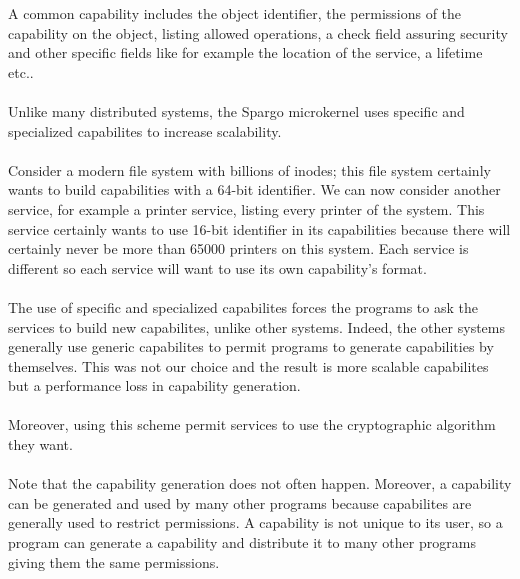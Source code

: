 \documentclass[10pt,a4wide]{article}
\begin{document}
\begin{multicols}{2}
A common capability includes the object identifier, the permissions of the
capability on the object, listing allowed operations, a check field assuring
security and other specific fields like for example the location of the
service, a lifetime etc..

\paragraph{}

Unlike many distributed systems, the Spargo microkernel uses specific and
specialized capabilites to increase scalability.

\paragraph{}

Consider a modern file system with billions of inodes; this file system
certainly wants to build capabilities with a 64-bit identifier.
We can now consider another service, for example a printer service, listing
every printer of the system. This service certainly wants to use 16-bit
identifier in its capabilities because there will certainly never be more than
65000 printers on this system. Each service is different so each service
will want to use its own capability's format.

\paragraph{}

The use of specific and specialized capabilites forces the programs to ask
the services to build new capabilites, unlike other systems. Indeed,
the other systems generally use generic capabilites to permit programs to
generate capabilities by themselves. This was not our choice and the result is
more scalable capabilites but a performance loss in capability generation.

\paragraph{}

Moreover, using this scheme permit services to use the cryptographic algorithm
they want.

\paragraph{}

Note that the capability generation does not often happen. Moreover,
a capability can be generated and used by many other programs because
capabilites are generally used to restrict permissions. A capability
is not unique to its user, so a program can generate a capability and
distribute it to many other programs giving them the same permissions.


\end{multicols}
\end{document}

